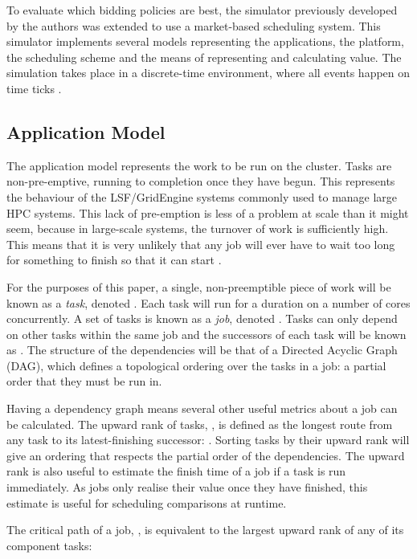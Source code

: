 \documentclass[english,british]{IEEEtran}
\begin{document}
To evaluate which bidding policies are best, the simulator previously
developed by the authors \cite{aburkimsherEngD14} was extended to
use a market-based scheduling system. This simulator implements several
models representing the applications, the platform, the scheduling
scheme and the means of representing and calculating value. The simulation
takes place in a discrete-time environment, where all events happen
on time ticks . 


\subsection{Application Model}

The application model represents the work to be run on the cluster.
Tasks are non-pre-emptive, running to completion once they have begun.
This represents the behaviour of the LSF/GridEngine systems commonly
used to manage large HPC systems. This lack of pre-emption is less
of a problem at scale than it might seem, because in large-scale systems,
the turnover of work is sufficiently high. This means that it is very
unlikely that any job will ever have to wait too long for something
to finish so that it can start \cite{burkimsher14}. 

For the purposes of this paper, a single, non-preemptible piece of
work will be known as a \emph{task}, denoted . Each task will
run for a duration  on
a number of cores  concurrently.
A set of tasks is known as a \emph{job}, denoted . Tasks can
only depend on other tasks within the same job and the successors
of each task will be known as  . The structure
of the dependencies will be that of a Directed Acyclic Graph (DAG),
which defines a topological ordering over the tasks in a job: a partial
order that they must be run in.

Having a dependency graph means several other useful metrics about
a job can be calculated. The upward rank \cite{Topcuoglu2002} of
tasks, , is defined as the longest route from
any task to its latest-finishing successor: .
Sorting tasks by their upward rank will give an ordering that respects
the partial order of the dependencies. The upward rank is also useful
to estimate the finish time of a job if a task is run immediately.
As jobs only realise their value once they have finished, this estimate
is useful for scheduling comparisons at runtime.

The critical path \cite{kelley61} of a job, ,
is equivalent to the largest upward rank of any of its component tasks:
\end{document}
